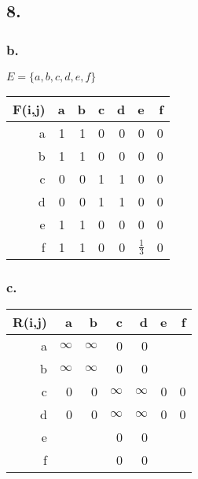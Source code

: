 \documentclass[12pt,fleqn]{article}
\begin{document}
\subsection*{8.}
\subsubsection*{b.}
$E=\{a,b,c,d,e,f\}$

\begin{tabular}{|r|r|r|r|r|r|r|}
  \hline
  F(i,j)&a&b&c&d&e&f\\\hline
  a&1&1&0&0&0&0\\\hline
  b&1&1&0&0&0&0\\\hline
  c&0&0&1&1&0&0\\\hline
  d&0&0&1&1&0&0\\\hline
  e&1&1&0&0&0&0\\\hline
  f&1&1&0&0&$\frac{1}{3}$&0\\\hline
\end{tabular}
\subsubsection*{c.}
\begin{tabular}{|r|r|r|r|r|r|r|}
  \hline
  R(i,j)&a&b&c&d&e&f\\\hline
  a&$\infty$&$\infty$&0&0&&\\\hline
  b&$\infty$&$\infty$&0&0&&\\\hline
  c&0&0&$\infty$&$\infty$&0&0\\\hline
  d&0&0&$\infty$&$\infty$&0&0\\\hline
  e&&&0&0&&\\\hline
  f&&&0&0&&\\\hline
\end{tabular}
  
\end{document}
